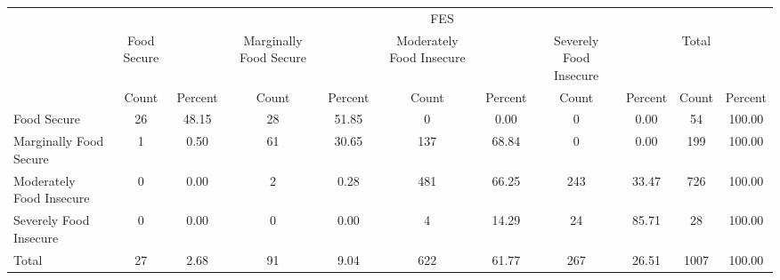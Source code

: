 {
\def\sym#1{\ifmmode^{#1}\else\(^{#1}\)\fi}
\begin{tabular}{l*{5}{cc}}
\hline\hline
            &\multicolumn{10}{c}{FES}                                                                                                         \\
            & Food Secure&            &Marginally Food Secure&            &Moderately Food Insecure&            &Severely Food Insecure&            &       Total&            \\
            &       Count&     Percent&       Count&     Percent&       Count&     Percent&       Count&     Percent&       Count&     Percent\\
\hline
Food Secure &          26&       48.15&          28&       51.85&           0&        0.00&           0&        0.00&          54&      100.00\\
Marginally Food Secure&           1&        0.50&          61&       30.65&         137&       68.84&           0&        0.00&         199&      100.00\\
Moderately Food Insecure&           0&        0.00&           2&        0.28&         481&       66.25&         243&       33.47&         726&      100.00\\
Severely Food Insecure&           0&        0.00&           0&        0.00&           4&       14.29&          24&       85.71&          28&      100.00\\
Total       &          27&        2.68&          91&        9.04&         622&       61.77&         267&       26.51&        1007&      100.00\\
\hline\hline
\end{tabular}
}
